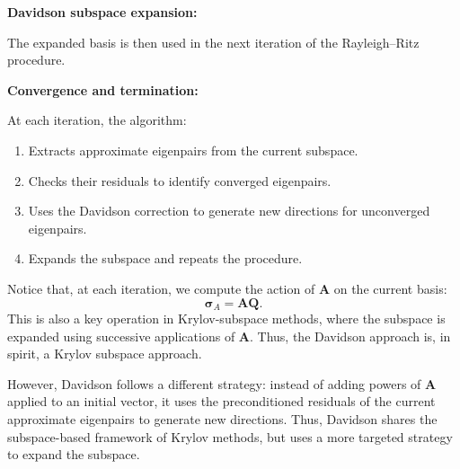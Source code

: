 \documentclass[10pt,aspectratio=169]{beamer}
\begin{document}
\begin{frame}
	\textbf{Davidson subspace expansion:}
	\begin{algorithm}[H]
		\SetAlgoLined
	\end{algorithm}
	
	\medskip
	The expanded basis is then used in the next iteration of the Rayleigh--Ritz procedure.
\end{frame}

\begin{frame}
	\textbf{Convergence and termination:}
	\begin{algorithm}[H]
		\SetAlgoLined
	\end{algorithm}
	
	\medskip
	At each iteration, the algorithm:
	\begin{enumerate}
		\item Extracts approximate eigenpairs from the current subspace.
		\item Checks their residuals to identify converged eigenpairs.
		\item Uses the Davidson correction to generate new directions for unconverged eigenpairs.
		\item Expands the subspace and repeats the procedure.
	\end{enumerate}
\end{frame}

\begin{frame}
	Notice that, at each iteration, we compute the action of $\mathbf A$ on the current basis:
	\begin{equation*}
		\boldsymbol{\sigma}_A=\mathbf A\mathbf Q.
	\end{equation*}
	This is also a key operation in Krylov-subspace methods, where the subspace is expanded using successive applications of $\mathbf A$.
	Thus, the Davidson approach is, in spirit, a Krylov subspace approach.
	
	\medskip
	However, Davidson follows a different strategy: instead of adding powers of $\mathbf A$ applied to an initial vector, it uses the preconditioned residuals of the current approximate eigenpairs to generate new directions.
	Thus, Davidson shares the subspace-based framework of Krylov methods, but uses a more targeted strategy to expand the subspace.
\end{frame}
\end{document}
